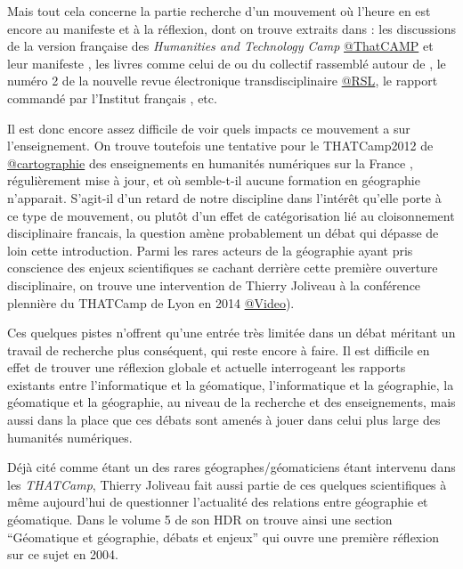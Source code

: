 Mais tout cela concerne la partie recherche d'un mouvement où l'heure en est encore au manifeste et à la réflexion, dont on trouve extraits dans : les discussions de la version française des \textit{Humanities and Technology Camp} \href{http://tcp.hypotheses.org/}{@ThatCAMP} et leur manifeste \autocite{THATCamp2010}, les livres comme celui de \textcite{Deuff2014} ou du collectif rassemblé autour de \textcite{Mounier2012}, le numéro 2 de la nouvelle revue électronique transdisciplinaire \href{http://rsl.revues.org/355}{@RSL}, le rapport commandé par l'Institut français \autocite{Dacos2015}, etc.

Il est donc encore assez difficile de voir quels impacts ce mouvement a sur l'enseignement. On trouve toutefois une tentative pour le THATCamp2012 de \href{http://pireh.univ-paris1.fr/DHfrancophone/index.php?rem&val=g%C3%A9ographie}{@cartographie} des enseignements en humanités numériques sur la France \autocites{Berra2012b,Clavaud2012}, régulièrement mise à jour, et où semble-t-il aucune formation en géographie n'apparait. S'agit-il d'un retard de notre discipline dans l'intérêt qu'elle porte à ce type de mouvement, ou plutôt d'un effet de catégorisation lié au cloisonnement disciplinaire francais, la question amène probablement un débat qui dépasse de loin cette introduction. Parmi les rares acteurs de la géographie ayant pris conscience des enjeux scientifiques se cachant derrière cette première ouverture disciplinaire, on trouve une intervention de Thierry Joliveau à la conférence plennière du THATCamp de Lyon en 2014 \href{http://dhlyon.hypotheses.org/587}{@Video}).

Ces quelques pistes n'offrent qu'une entrée très limitée dans un débat méritant un travail de recherche plus conséquent, qui reste encore à faire. Il est difficile en effet de trouver une réflexion globale et actuelle interrogeant les rapports existants entre l'informatique et la géomatique, l'informatique et la géographie, la géomatique et la géographie, au niveau de la recherche et des enseignements, mais aussi dans la place que ces débats sont amenés à jouer dans celui plus large des humanités numériques.


Déjà cité comme étant un des rares géographes/géomaticiens étant intervenu dans les \textit{THATCamp}, Thierry Joliveau fait aussi partie de ces quelques scientifiques à même aujourd'hui de questionner l'actualité des relations entre géographie et géomatique. Dans le volume 5 de son HDR on trouve ainsi une section \enquote{Géomatique et géographie, débats et enjeux} qui ouvre une première réflexion sur ce sujet en 2004.

